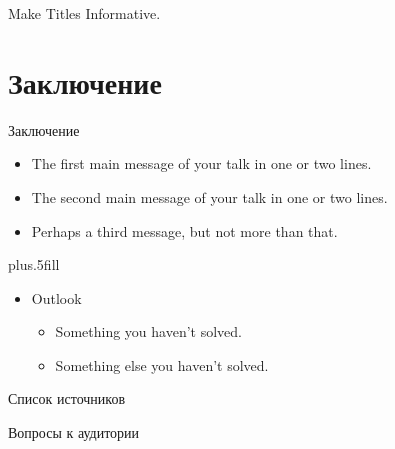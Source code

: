 \documentclass{beamer}
\begin{document}
\begin{frame}{Make Titles Informative.}
\end{frame}

\section{Заключение}

\begin{frame}{Заключение}

  \begin{itemize}
    \item
      The \alert{first main message} of your talk in one or two lines.
    \item
      The \alert{second main message} of your talk in one or two lines.
    \item
      Perhaps a \alert{third message}, but not more than that.
  \end{itemize}

  \vskip0pt plus.5fill
  \begin{itemize}
    \item
      Outlook
      \begin{itemize}
        \item
          Something you haven't solved.
        \item
          Something else you haven't solved.
      \end{itemize}
  \end{itemize}
\end{frame}

\begin{frame}[allowframebreaks]{Список источников} 
  \nocite{*}
  \printbibliography
\end{frame}

\begin{frame}{Вопросы к аудитории} 

\end{frame}

\begin{frame}
  \titlepage
\end{frame}
\end{document}
